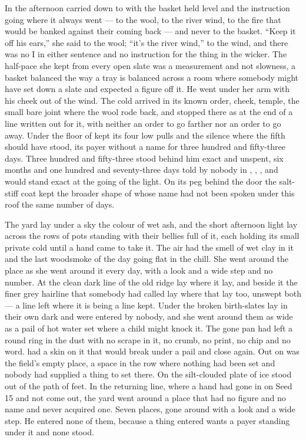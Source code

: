 In the afternoon  carried  down to  with the basket held level and the instruction going where it always went --- to the wool, to the river wind, to the fire that would be banked against their coming back --- and never to the basket. “Keep it off his ears,” she said to the wool; “it’s the river wind,” to the wind, and there was no I in either sentence and no instruction for the thing in the wicker. The half-pace she kept from every open slate was a measurement and not slowness, a basket balanced the way a tray is balanced across a room where somebody might have set down a slate and expected a figure off it. He went under her arm with his cheek out of the wind. The cold arrived in its known order, cheek, temple, the small bare joint where the wool rode back, and stopped there as at the end of a line written out for it, with neither an order to go farther nor an order to go away. Under the floor of   kept its four low pulls and the silence where the fifth should have stood, its payer without a name for three hundred and fifty-three days. Three hundred and fifty-three stood behind him exact and unspent, six months and one hundred and seventy-three days told by nobody in , , , and would stand exact at the going of the light. On its peg behind the door the salt-stiff coat kept the broader shape of  whose name had not been spoken under this roof the same number of days.

The yard lay under a sky the colour of wet ash, and the short afternoon light lay across the rows of pots standing with their bellies full of it, each holding its small private cold until a hand came to take it. The air had the smell of wet clay in it and the last woodsmoke of the day going flat in the chill. She went around the place as she went around it every day, with a look and a wide step and no number. At  the clean dark line of the old  ridge lay where it lay, and beside it the finer grey hairline that somebody had called  lay where that lay too, unswept both --- a line left where it is being a line kept. Under  the broken birth-slates lay in their own dark and were entered by nobody, and she went around them as wide as a pail of hot water set where a child might knock it. The gone pan had left a round ring in the dust with no scrape in it, no crumb, no print, no chip and no word.  had a skin on it that would break under a pail and close again. Out on  was the field’s empty place, a space in the row where nothing had been set and nobody had supplied a thing to set there. On  the silt-clouded plate of ice stood out of the path of feet. In the returning line, where a hand had gone in on Seed 15 and not come out, the yard went around a place that had no figure and no name and never acquired one. Seven places, gone around with a look and a wide step. He entered none of them, because a thing entered wants a payer standing under it and none stood.

